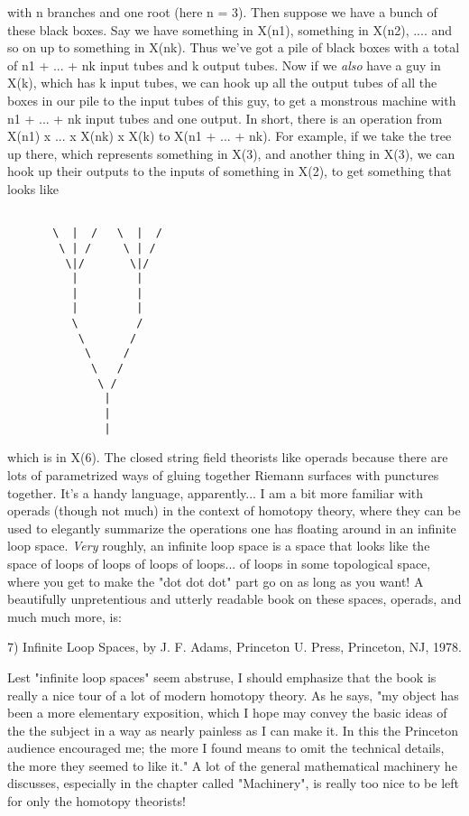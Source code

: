 with n branches and one root (here n = 3).  Then suppose we have a bunch
of these black boxes.  Say we have something in X(n1), something in
X(n2), .... and so on up to something in X(nk).  Thus we've got a pile
of black boxes with a total of n1 + ... + nk input tubes and k output
tubes.  Now if we \emph{also} have a guy in X(k), which has k input tubes, we
can hook up all the output tubes of all the boxes in our pile to the
input tubes of this guy, to get a monstrous machine with n1 + ... + nk
input tubes and one output.   In short, there is an operation from
X(n1) x ... x X(nk) x X(k) to X(n1 + ... + nk).  For example, if we take
the tree up there, which represents something in X(3), and another
thing in X(3), we can hook up their outputs to the inputs of something
in X(2), to get something that looks like


\begin{verbatim}

       \  |  /   \  |  /
        \ | /     \ | /
         \|/       \|/
          |         |
          |         |
          |         |
          \         /
           \       /
            \     / 
             \   /
              \ /
               |
               |
               |
\end{verbatim}
    

which is in X(6).  The closed string field theorists like operads
because there are lots of parametrized ways of gluing together Riemann
surfaces with punctures together.  It's a handy language, apparently...
I am a bit more familiar with operads (though not much) in the context
of homotopy theory, where they can be used to elegantly summarize the
operations one has floating around in an infinite loop space.  \emph{Very}
roughly, an infinite loop space is a space that looks like the space of 
loops of loops of loops of loops... of loops in some topological space,
where you get to make the "dot dot dot" part go on as long as you want!
A beautifully unpretentious and utterly readable book on these spaces,
operads, and much much more, is:

7) Infinite Loop Spaces, by J. F. Adams, Princeton U. Press, Princeton,
NJ, 1978.  

Lest "infinite loop spaces" seem abstruse, I should emphasize that the
book is really a nice tour of a lot of modern homotopy theory.  As he
says, "my object has been a more elementary exposition, which I hope may
convey the basic ideas of the the subject in a way as nearly painless as
I can make it.  In this the Princeton audience encouraged me; the more I
found means to omit the technical details, the more they seemed to like
it."  A lot of the general mathematical machinery he discusses,
especially in the chapter called "Machinery", is really too nice to be
left for only the homotopy theorists!  

